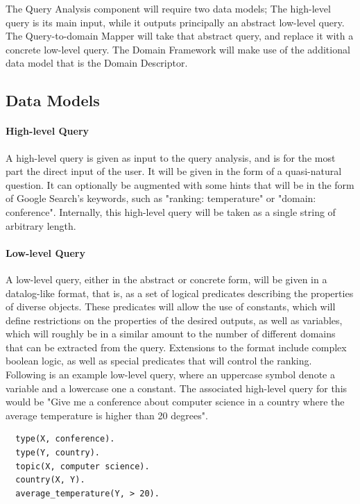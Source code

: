The Query Analysis component will require two data models; The high-level query is its main input, while it outputs principally an abstract low-level query. The Query-to-domain Mapper will take that abstract query, and replace it with a concrete low-level query. The Domain Framework will make use of the additional data model that is the Domain Descriptor.

\subsection{Data Models} %
\label{sub:data_models_seco}


\paragraph{High-level Query} %
A high-level query is given as input to the query analysis, and is for the most part the direct input of the user. It will be given in the form of a quasi-natural question. It can optionally be augmented with some hints that will be in the form of Google Search's keywords, such as "ranking: temperature" or "domain: conference". Internally, this high-level query will be taken as a single string of arbitrary length.


\paragraph{Low-level Query} %
A low-level query, either in the abstract or concrete form, will be given in a datalog-like format, that is, as a set of logical predicates describing the properties of diverse objects. These predicates will allow the use of constants, which will define restrictions on the properties of the desired outputs, as well as variables, which will roughly be in a similar amount to the number of different domains that can be extracted from the query. Extensions to the format include complex boolean logic, as well as special predicates that will control the ranking.  Following is an example low-level query, where an uppercase symbol denote a variable and a lowercase one a constant. The associated high-level query for this would be "Give me a conference about computer science in a country where the average temperature is higher than 20 degrees".

\begin{verbatim}
  type(X, conference).
  type(Y, country).
  topic(X, computer science).
  country(X, Y).
  average_temperature(Y, > 20).
\end{verbatim}

